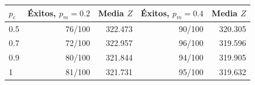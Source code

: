 \begin{tabular}{lrrrr}\toprule
$p_c$ & Éxitos, $p_m=0.2$ & Media $Z$ & Éxitos, $p_m=0.4$ & Media $Z$\\\midrule
0.5 & 76/100 & 322.473 & 90/100 & 320.305\\
0.7 & 72/100 & 322.957 & 96/100 & 319.596\\
0.9 & 80/100 & 321.844 & 94/100 & 319.905\\
1 & 81/100 & 321.731 & 95/100 & 319.632\\
\bottomrule\end{tabular}
